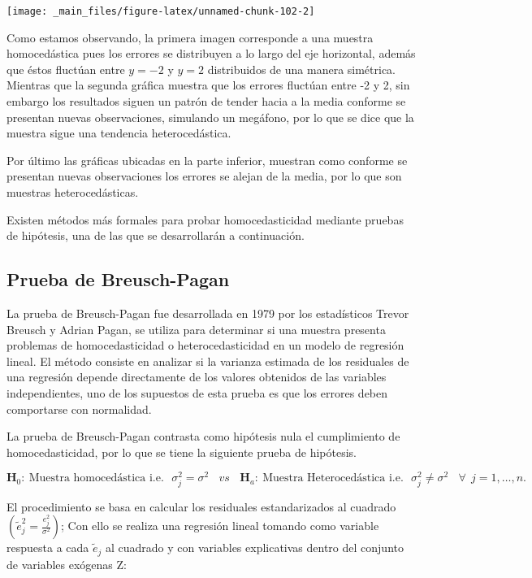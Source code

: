 \documentclass[
  a4paper,
  oneside,
  openany]{book}
\begin{document}
\begin{center}\texttt{[image: \_main\_files/figure-latex/unnamed-chunk-102-2]} \end{center}

Como estamos observando, la primera imagen corresponde a una muestra homocedástica pues los errores se distribuyen a lo largo del eje horizontal, además que éstos fluctúan entre \(y=-2\) y \(y=2\) distribuidos de una manera simétrica. Mientras que la segunda gráfica muestra que los errores fluctúan entre -2 y 2, sin embargo los resultados siguen un patrón de tender hacia a la media conforme se presentan nuevas observaciones, simulando un megáfono, por lo que se dice que la muestra sigue una tendencia heterocedástica.

Por último las gráficas ubicadas en la parte inferior, muestran como conforme se presentan nuevas observaciones los errores se alejan de la media, por lo que son muestras heterocedásticas.

Existen métodos más formales para probar homocedasticidad mediante pruebas de hipótesis, una de las que se desarrollarán a continuación.

\hypertarget{prueba-de-breusch-pagan}{%
\subsection{Prueba de Breusch-Pagan}\label{prueba-de-breusch-pagan}}

La prueba de Breusch-Pagan fue desarrollada en 1979 por los estadísticos Trevor Breusch y Adrian Pagan, se utiliza para determinar si una muestra presenta problemas de homocedasticidad o heterocedasticidad en un modelo de regresión lineal. El método consiste en analizar si la varianza estimada de los residuales de una regresión depende directamente de los valores obtenidos de las variables independientes, uno de los supuestos de esta prueba es que los errores deben comportarse con normalidad.

La prueba de Breusch-Pagan contrasta como hipótesis nula el cumplimiento de homocedasticidad, por lo que se tiene la siguiente prueba de hipótesis.

\[\textbf{H}_0: \ \mbox{Muestra homocedástica  i.e.} \ \ \ \sigma^2_{j}=\sigma^2 \ \ \ \ vs  \ \ \ \
\textbf{H}_a:  \ \mbox{Muestra Heterocedástica  i.e.} \ \ \ \sigma^2_{j} \neq \sigma^2 \ \ \ \ \forall  \ \ j = 1,\ldots,n.\]

El procedimiento se basa en calcular los residuales estandarizados al cuadrado \(\left( \tilde{e}^2_{j}=\frac{e^2_{j}}{\sigma^2}\right)\); Con ello se realiza una regresión lineal tomando como variable respuesta a cada \(\tilde{e}_{j}\) al cuadrado y con variables explicativas dentro del conjunto de variables exógenas Z:
\end{document}
